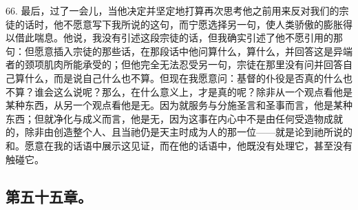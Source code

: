66. 最后，过了一会儿，当他决定并坚定地打算再次思考他之前用来反对我们的宗徒的话时，他不愿意写下我所说的这句，而宁愿选择另一句，使人类骄傲的膨胀得以借此喘息。他说，我没有引述这段宗徒的话，但我确实引述了他不愿引用的那句：但愿意插入宗徒的那些话，在那段话中他问算什么，算什么，并回答这是异端者的颈项肌肉所能承受的；但他完全无法忍受另一句，宗徒在那里没有问并回答自己算什么，而是说自己什么也不算。但现在我愿意问：基督的仆役是否真的什么也不算？谁会这么说呢？那么，在什么意义上，才是真的呢？除非从一个观点看他是某种东西，从另一个观点看他是无。因为就服务与分施圣言和圣事而言，他是某种东西；但就净化与成义而言，他是无，因为这事在内心中不是由任何受造物成就的，除非由创造整个人、且当祂仍是天主时成为人的那一位——就是论到祂所说的和。愿意在我的话语中展示这见证，而在他的话语中，他既没有处理它，甚至没有触碰它。\par


\subsection{第五十五章。}

